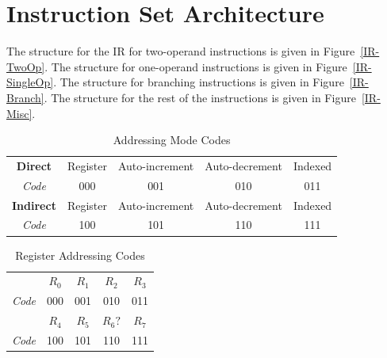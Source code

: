 \documentclass[12pt]{article}
\theoremstyle{plain}
\theoremstyle{definition}
\begin{document}
    

\section{Instruction Set Architecture}
    The structure for the IR for two-operand instructions is given in Figure~\ref{IR-TwoOp}. The structure for one-operand instructions is given in Figure~\ref{IR-SingleOp}. The structure for branching instructions is given in Figure~\ref{IR-Branch}. The structure for the rest of the instructions is given in Figure~\ref{IR-Misc}.
    \begin{table}[H]
        \centering
        \begin{tabular}{c|c|c|c|c|}
            \cline{2-5}
            \textbf{Direct}   & Register & Auto-increment & Auto-decrement & Indexed \\ \cline{2-5} 
            \textit{Code}     & 000      & 001            & 010            & 011     \\ \cline{2-5} 
            \textbf{Indirect} & Register & Auto-increment & Auto-decrement & Indexed \\ \cline{2-5} 
            \textit{Code}     & 100      & 101            & 110            & 111     \\ \cline{2-5} 
        \end{tabular}
        \caption{Addressing Mode Codes}
        \label{addr-mode-codes}
    \end{table}
    \begin{table}[H]
        \centering
        \begin{tabular}{c|c|c|c|c|}
            \cline{2-5}
                            & $R_0$ & $R_1$ & $R_2$ & $R_3$ \\ \cline{2-5} 
            \textit{Code}   & 000      & 001            & 010            & 011     \\ \cline{2-5} 
                            & $R_4$ & $R_5$ & $R_6?$ & $R_7$ \\ \cline{2-5} 
            \textit{Code}   & 100      & 101            & 110            & 111     \\ \cline{2-5} 
        \end{tabular}
        \caption{Register Addressing Codes}
        \label{reg-addr-codes}
    \end{table}
\end{document}
